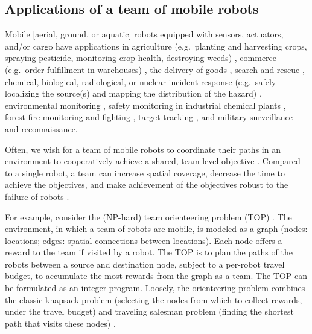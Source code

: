 \documentclass[11pt, oneside]{article}
\begin{document}
\subsection{Applications of a team of mobile robots}
Mobile [aerial, ground, or aquatic] robots equipped with sensors, actuators, and/or cargo have applications in agriculture (e.g.\ planting and harvesting crops, spraying pesticide, monitoring crop health, destroying weeds) \cite{santos2020path,bawden2017robot,mcallister2018multi}, commerce (e.g.\ order fulfillment in warehouses) \cite{wurman2008coordinating}, the delivery of goods \cite{coelho2014thirty}, search-and-rescue \cite{queralta2020collaborative,rouvcek2020darpa}, chemical, biological, radiological, or nuclear incident response (e.g.\ safely localizing the source(s) and mapping the distribution of the hazard) \cite{murphy2012projected,hutchinson2019unmanned}, environmental monitoring \cite{dunbabin2012robots,hernandez2012mobile,yuan2020maritime}, safety monitoring in industrial chemical plants \cite{soldan2014towards,francis2022gas}, forest fire monitoring and fighting \cite{merino2012unmanned}, target tracking \cite{robin2016multi}, and military surveillance and reconnaissance. 

Often, we wish for a team of mobile robots to coordinate their paths in an environment to cooperatively achieve a shared, team-level objective \cite{parker1995design,parker2007distributed}.
Compared to a single robot, a team can increase spatial coverage, decrease the time to achieve the objectives, and make achievement of the objectives robust to the failure of robots \cite{schranz2020swarm,brambilla2013swarm}.


For example, consider the (NP-hard) team orienteering \cite{golden1987orienteering} problem (TOP) \cite{chao1996team,gunawan2016orienteering,vansteenwegen2011orienteering}. 
The environment, in which a team of robots are mobile, is modeled as a graph (nodes: locations; edges: spatial connections between locations). Each node offers a reward to the team if visited by a robot.
The TOP is to plan the paths of the robots between a source and destination node, subject to a per-robot travel budget, to accumulate the most rewards from the graph as a team. The TOP can be formulated as an integer program. Loosely, the orienteering problem combines the classic knapsack problem (selecting the nodes from which to collect rewards, under the travel budget) and traveling salesman problem (finding the shortest path that visits these nodes) \cite{vansteenwegen2011orienteering}.
\end{document}
